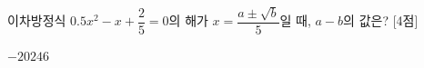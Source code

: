 이차방정식 $0.5x^2-x+\dfrac{2}{5}=0$의 해가 $x=\dfrac{a\pm\sqrt{b}}{5}$일 때, $a-b$의 값은?  \mbox{[4점]}
\begin{choices32}{$-2$}{$0$}{$2$}{$4$}{$6$}\end{choices32}
